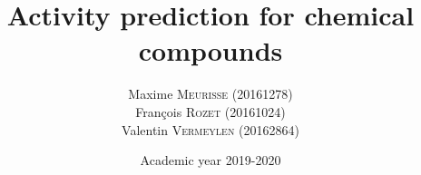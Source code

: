 \documentclass[a4paper, 12pt]{article}
\title{Activity prediction for chemical compounds}
\author{
    Maxime \textsc{Meurisse} (20161278)\\
    François \textsc{Rozet} (20161024)\\
    Valentin \textsc{Vermeylen} (20162864)\\
}
\date{Academic year 2019-2020}
\begin{document}
	
	
	
	
	
	
	
	
	
	
	
	
	
	
	
	
	
	
    \newpage
    \nocite{*}
    \printbibliography
\end{document}
